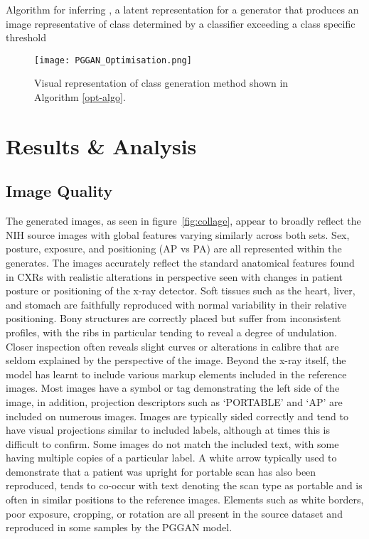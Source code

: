\documentclass{article}
\begin{document}
\begin{algorithm}[H]
\label{opt-algo}
\SetAlgoLined
\;
 \Return{}
 \caption{Algorithm for inferring  , a latent representation for a generator  that produces an image  representative of class  determined by a classifier  exceeding a class specific threshold }
\end{algorithm}

\begin{figure}[!htb]
    \centering
    \texttt{[image: PGGAN\_Optimisation.png]}
    \caption{Visual representation of class generation method shown in Algorithm \ref{opt-algo}. }
    \label{fig:class-optim}
\end{figure}

\section{Results \& Analysis}
\label{sec:analysis}
\subsection{Image Quality}
\label{sec:img_quality}
The generated images, as seen in figure~\ref{fig:collage}, appear to broadly reflect the NIH source images with global features varying similarly across both sets. Sex, posture, exposure, and positioning (AP vs PA) are all represented within the generates. The images accurately reflect the standard anatomical features found in CXRs with realistic alterations in perspective seen with changes in patient posture or positioning of the x-ray detector. Soft tissues such as the heart, liver, and stomach are faithfully reproduced with normal variability in their relative positioning. Bony structures are correctly placed but suffer from inconsistent profiles, with the ribs in particular tending to reveal a degree of undulation. Closer inspection often reveals slight curves or alterations in calibre that are seldom explained by the perspective of the image. Beyond the x-ray itself, the model has learnt to include various markup elements included in the reference images. Most images have a symbol or tag demonstrating the left side of the image, in addition, projection descriptors such as `PORTABLE' and `AP' are included on numerous images. Images are typically sided correctly and tend to have visual projections similar to included labels, although at times this is difficult to confirm. Some images do not match the included text, with some having multiple copies of a particular label. A white arrow typically used to demonstrate that a patient was upright for portable scan has also been reproduced, tends to co-occur with text denoting the scan type as portable and is often in similar positions to the reference images. Elements such as white borders, poor exposure, cropping, or rotation are all present in the source dataset and reproduced in some samples by the PGGAN model.
\end{document}
